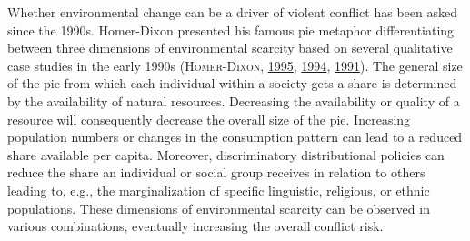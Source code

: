 \documentclass[a4paper,11pt]{article}
\begin{document}
Whether environmental change can be a driver of violent
conflict has been asked since the 1990s. Homer-Dixon presented his famous pie
metaphor differentiating between three dimensions of environmental scarcity based
on several qualitative case studies in the early 1990s \textsc{(\textnormal{\textsc{Homer-Dixon}}, \textnormal{\protect\hyperlink{ref-homerdixon1995}{1995}}, \protect\hyperlink{ref-homerdixon1994}{1994}, \protect\hyperlink{ref-homerdixon1991}{1991})}. The
general size of the pie from which each individual within a society gets a share
is determined by the availability of natural resources. Decreasing the availability
or quality of a resource will consequently decrease the overall size of the pie.
Increasing population numbers or changes in the consumption pattern can lead to
a reduced share available per capita. Moreover, discriminatory distributional
policies can reduce the share an individual or social group receives in relation
to others leading to, e.g., the marginalization of specific linguistic, religious,
or ethnic populations. These dimensions of environmental scarcity can be observed
in various combinations, eventually increasing the overall conflict risk.

\newpage
\end{document}
